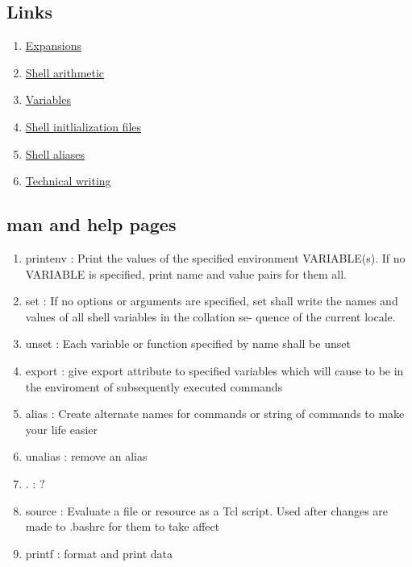 \documentclass[12pt, letterpaper]{report}
\begin{document}
\subsection{Links}
\begin{enumerate}
	\item \href{http://linuxcommand.org/lc3_lts0080.php}{Expansions}
	\item \href{https://www.gnu.org/software/bash/manual/html_node/Shell-Arithmetic.html}{Shell arithmetic}
	\item \href{https://tldp.org/LDP/Bash-Beginners-Guide/html/sect_03_02.html}{Variables}
	\item \href{https://tldp.org/LDP/Bash-Beginners-Guide/html/sect_03_01.html}{Shell initlialization files}
	\item \href{http://www.linfo.org/alias.html}{Shell aliases}
	\item \href{https://s3.amazonaws.com/alx-intranet.hbtn.io/uploads/misc/2021/6/9112669886fd446a2aa3113c31319d1f468dc160.pdf?X-Amz-Algorithm=AWS4-HMAC-SHA256&X-Amz-Credential=AKIARDDGGGOUSBVO6H7D%2F20230516%2Fus-east-1%2Fs3%2Faws4_request&X-Amz-Date=20230516T052125Z&X-Amz-Expires=86400&X-Amz-SignedHeaders=host&X-Amz-Signature=166511ec18d6352ae3822e0fbf53ddd166240e72c8ac7a84e3c265b834c76c4e}{Technical writing}
\end{enumerate}

\subsection{man and help pages}
\begin{enumerate}
	\item printenv :  Print  the  values  of the specified environment VARIABLE(s).
       If no VARIABLE is specified, print name and value  pairs  for
       them all.
   \item set : If no options or arguments are specified, set shall write the
       names  and values of all shell variables in the collation se‐
       quence of the current locale.
   \item unset : Each variable or function specified by name shall be unset
   \item export : give export attribute to specified variables which will cause to be in the enviroment of subsequently executed commands
   \item alias : Create alternate names for commands or string of commands to make your life easier
   \item unalias : remove an alias
   \item . : ?
   \item source : Evaluate a file or resource as a Tcl script. Used after changes are made to .bashrc for them to take affect
   \item printf : format and print data
\end{enumerate}
\end{document}
